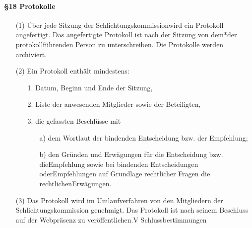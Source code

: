         \paragraph{§18    Protokolle}
            \begin{itemize}
                \item[(1)]    Über jede Sitzung der Schlichtungskommissionwird ein Protokoll angefertigt. Das angefertigte Protokoll ist nach der Sitzung von dem*der protokollführenden Person zu unterschreiben. Die Protokolle werden archiviert.
                \item[(2)]    Ein Protokoll enthält mindestens:
                    \begin{itemize}
                        \item[1.]  Datum, Beginn und Ende der Sitzung,
                        \item[2.]  Liste der anwesenden Mitglieder sowie der Beteiligten,
                        \item[3.]  die gefassten Beschlüsse mit
                            \begin{itemize}
                                \item[a)] dem Wortlaut der bindenden Entscheidung bzw. der Empfehlung;
                                \item[b)] den Gründen und Erwägungen für die Entscheidung bzw. dieEmpfehlung sowie bei bindenden Entscheidungen oderEmpfehlungen auf Grundlage rechtlicher Fragen die rechtlichenErwägungen.
                            \end{itemize}
                    \end{itemize}
                \item[(3)]    Das Protokoll wird im Umlaufverfahren von den Mitgliedern der Schlichtungskommission genehmigt. Das Protokoll ist nach seinem Beschluss auf der Webpräsenz zu veröffentlichen.V Schlussbestimmungen
            \end{itemize}    
